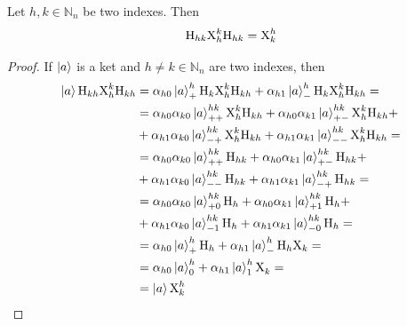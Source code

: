 \documentclass[sigconf,natbib=false]{acmart}
\begin{document}
	\begin{proposition}
		Let $h,k \in \mathbb{N}_n$ be two indexes.
		Then
		\begin{equation}
			\text{H}_{hk}\text{X}^{k}_{h}\text{H}_{hk} = \text{X}^{h}_{k}
		\end{equation}
	\end{proposition}
	\begin{proof}
		If $\ket{a}$ is a ket and $h\neq k \in \mathbb{N}_n$ are two indexes, then
		\begin{align*}
			\ket{a}\text{H}_{kh}\text{X}^{k}_{h}\text{H}_{kh}
			&=\alpha_{h0}\ket{a}^{h}_{+}\text{H}_k\text{X}^{k}_{h}\text{H}_{kh} + \alpha_{h1}\ket{a}^{h}_{-}\text{H}_k\text{X}^{k}_{h}\text{H}_{kh}=\\
			&=\alpha_{h0}\alpha_{k0}\ket{a}^{hk}_{++}\text{X}^{k}_{h}\text{H}_{kh} + \alpha_{h0}\alpha_{k1}\ket{a}^{hk}_{+-}\text{X}^{k}_{h}\text{H}_{kh}+\\
			&+\alpha_{h1}\alpha_{k0}\ket{a}^{hk}_{-+}\text{X}^{k}_{h}\text{H}_{kh} + \alpha_{h1}\alpha_{k1}\ket{a}^{hk}_{--}\text{X}^{k}_{h}\text{H}_{kh}=\\
			&=\alpha_{h0}\alpha_{k0}\ket{a}^{hk}_{++}\text{H}_{hk} + \alpha_{h0}\alpha_{k1}\ket{a}^{hk}_{+-}\text{H}_{hk}+\\
			&+\alpha_{h1}\alpha_{k0}\ket{a}^{hk}_{--}\text{H}_{hk} + \alpha_{h1}\alpha_{k1}\ket{a}^{hk}_{-+}\text{H}_{hk}=\\
			&=\alpha_{h0}\alpha_{k0}\ket{a}^{hk}_{+0}\text{H}_h + \alpha_{h0}\alpha_{k1}\ket{a}^{hk}_{+1}\text{H}_h+\\
			&+\alpha_{h1}\alpha_{k0}\ket{a}^{hk}_{-1}\text{H}_h + \alpha_{h1}\alpha_{k1}\ket{a}^{hk}_{-0}\text{H}_h=\\
			&=\alpha_{h0}\ket{a}^{h}_{+}\text{H}_h+\alpha_{h1}\ket{a}^{h}_{-}\text{H}_h\text{X}_k=\\
			&=\alpha_{h0}\ket{a}^{h}_{0}+\alpha_{h1}\ket{a}^{h}_{1}\text{X}^{}_{k}=\\
			&=\ket{a}\text{X}^{h}_{k}
		\end{align*}
	\end{proof}
\end{document}
